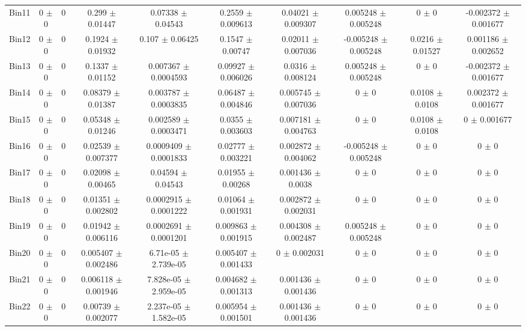 \begin{tabular}{@{\extracolsep{4pt}}lccccccccc@{}}
     Bin11 & 0 $\pm$ 0 & 0 & 0.299 $\pm$ 0.01447 & 0.07338 $\pm$ 0.04543 & 0.2559 $\pm$ 0.009613 & 0.04021 $\pm$ 0.009307 & 0.005248 $\pm$ 0.005248 & 0 $\pm$ 0 & -0.002372 $\pm$ 0.001677 \\ 
     Bin12 & 0 $\pm$ 0 & 0 & 0.1924 $\pm$ 0.01932 & 0.107 $\pm$ 0.06425 & 0.1547 $\pm$ 0.00747 & 0.02011 $\pm$ 0.007036 & -0.005248 $\pm$ 0.005248 & 0.0216 $\pm$ 0.01527 & 0.001186 $\pm$ 0.002652 \\ 
     Bin13 & 0 $\pm$ 0 & 0 & 0.1337 $\pm$ 0.01152 & 0.007367 $\pm$ 0.0004593 & 0.09927 $\pm$ 0.006026 & 0.0316 $\pm$ 0.008124 & 0.005248 $\pm$ 0.005248 & 0 $\pm$ 0 & -0.002372 $\pm$ 0.001677 \\ 
     Bin14 & 0 $\pm$ 0 & 0 & 0.08379 $\pm$ 0.01387 & 0.003787 $\pm$ 0.0003835 & 0.06487 $\pm$ 0.004846 & 0.005745 $\pm$ 0.007036 & 0 $\pm$ 0 & 0.0108 $\pm$ 0.0108 & 0.002372 $\pm$ 0.001677 \\ 
     Bin15 & 0 $\pm$ 0 & 0 & 0.05348 $\pm$ 0.01246 & 0.002589 $\pm$ 0.0003471 & 0.0355 $\pm$ 0.003603 & 0.007181 $\pm$ 0.004763 & 0 $\pm$ 0 & 0.0108 $\pm$ 0.0108 & 0 $\pm$ 0.001677 \\ 
     Bin16 & 0 $\pm$ 0 & 0 & 0.02539 $\pm$ 0.007377 & 0.0009409 $\pm$ 0.0001833 & 0.02777 $\pm$ 0.003221 & 0.002872 $\pm$ 0.004062 & -0.005248 $\pm$ 0.005248 & 0 $\pm$ 0 & 0 $\pm$ 0 \\ 
     Bin17 & 0 $\pm$ 0 & 0 & 0.02098 $\pm$ 0.00465 & 0.04594 $\pm$ 0.04543 & 0.01955 $\pm$ 0.00268 & 0.001436 $\pm$ 0.0038 & 0 $\pm$ 0 & 0 $\pm$ 0 & 0 $\pm$ 0 \\ 
     Bin18 & 0 $\pm$ 0 & 0 & 0.01351 $\pm$ 0.002802 & 0.0002915 $\pm$ 0.0001222 & 0.01064 $\pm$ 0.001931 & 0.002872 $\pm$ 0.002031 & 0 $\pm$ 0 & 0 $\pm$ 0 & 0 $\pm$ 0 \\ 
     Bin19 & 0 $\pm$ 0 & 0 & 0.01942 $\pm$ 0.006116 & 0.0002691 $\pm$ 0.0001201 & 0.009863 $\pm$ 0.001915 & 0.004308 $\pm$ 0.002487 & 0.005248 $\pm$ 0.005248 & 0 $\pm$ 0 & 0 $\pm$ 0 \\ 
     Bin20 & 0 $\pm$ 0 & 0 & 0.005407 $\pm$ 0.002486 & 6.71e-05 $\pm$ 2.739e-05 & 0.005407 $\pm$ 0.001433 & 0 $\pm$ 0.002031 & 0 $\pm$ 0 & 0 $\pm$ 0 & 0 $\pm$ 0 \\ 
     Bin21 & 0 $\pm$ 0 & 0 & 0.006118 $\pm$ 0.001946 & 7.828e-05 $\pm$ 2.959e-05 & 0.004682 $\pm$ 0.001313 & 0.001436 $\pm$ 0.001436 & 0 $\pm$ 0 & 0 $\pm$ 0 & 0 $\pm$ 0 \\ 
     Bin22 & 0 $\pm$ 0 & 0 & 0.00739 $\pm$ 0.002077 & 2.237e-05 $\pm$ 1.582e-05 & 0.005954 $\pm$ 0.001501 & 0.001436 $\pm$ 0.001436 & 0 $\pm$ 0 & 0 $\pm$ 0 & 0 $\pm$ 0 \\ 

\end{tabular}
